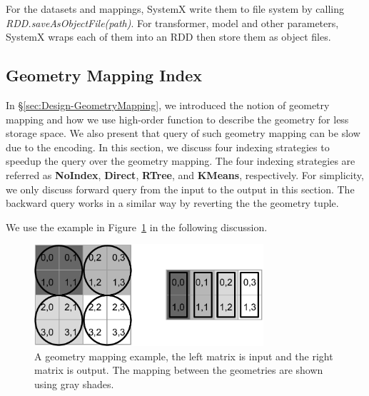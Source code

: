 \documentclass{sig-alternate}
\begin{document}
For the datasets and mappings, SystemX write them to file system by calling {\it RDD.saveAsObjectFile(path)}.
For transformer, model and other parameters, SystemX wraps each of them into an RDD then store them as object files.


\subsection{Geometry Mapping Index}
\label{sec:GeometryIndex}
In \S\ref{sec:Design-GeometryMapping}, we introduced the notion of geometry mapping and how we use high-order function
to describe the geometry for less storage space. 
We also present that query of such geometry mapping can be slow due to the encoding. 
In this section, we discuss four indexing strategies to speedup the query over the geometry mapping. 
The four indexing strategies are referred as {\bf NoIndex}, {\bf Direct}, {\bf RTree}, and {\bf KMeans}, respectively.
For simplicity, we only discuss forward query from the input to the output in this section.
The backward query works in a similar way by reverting the the geometry tuple.


We use the example in Figure~\ref{fig:example} in the following discussion.
\begin{figure}[t]
\begin{center}
    \includegraphics[width=85mm]{pictures/example}
\caption {A geometry mapping example, the left matrix is input and the right matrix is output. The mapping between the geometries are shown using gray shades.
    \label{fig:example}
}
\end{center}
\end{figure}
\end{document}
